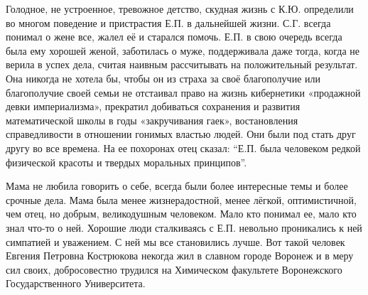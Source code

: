 Голодное, не устроенное, тревожное детство, скудная
\linebreak
жизнь с К.Ю. определили во многом поведение и пристрастия Е.П. в дальнейшей жизни.
С.Г. всегда понимал о жене все, жалел её и старался помочь. Е.П. в свою очередь всегда была ему хорошей женой, заботилась о муже, поддерживала даже тогда, когда не верила в успех дела, считая наивным рассчитывать на положительный результат. Она никогда не хотела бы, чтобы он из страха за своё благополучие или благополучие своей семьи не отстаивал право на жизнь кибернетики «продажной девки империализма», прекратил добиваться сохранения и развития математической школы в годы «закручивания гаек», востановления справедливости в отношении гонимых властью людей. Они были под стать друг другу во все времена. На ее похоронах отец сказал: “Е.П. была человеком редкой физической красоты и твердых моральных принципов”.

Мама не любила говорить о себе, всегда были более интересные темы и более срочные дела. Мама была менее жизнерадостной, менее лёгкой, оптимистичной, чем отец, но добрым, великодушным человеком. Мало кто понимал ее, мало кто знал что-то о ней. Хорошие люди сталкиваясь с Е.П. невольно проникались к ней симпатией и уважением. С ней мы все становились лучше.
Вот такой человек Евгения Петровна Кострюкова некогда жил в славном городе Воронеж и в меру сил своих, добросовестно трудился на Химическом факультете Воронежского Государственного Университета.
